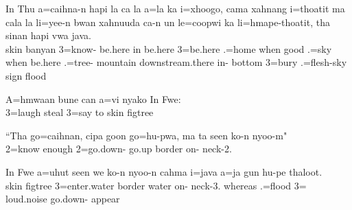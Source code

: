 \ea
\gll In Thu a=caihna-n hapi la ca la a=la ka i=xhoogo, cama xahnang i=thoatit ma cala la li=yee-n bwan xahnuuda ca-n un le=coopwi ka li=hmape-thoatit, tha sinan hapi vwa java.\\ skin banyan 3=know-  be.here in be.here 3=be.here  .=home when good .=sky  when be.here .=tree- mountain downstream.there in- bottom 3=bury  .=flesh-sky  sign   flood\\ \glt {} 
\z

\ea
\gll A=hmwaan bune can a=vi nyako In Fwe:\\ 3=laugh steal  3=say to skin figtree\\ \glt {} 
\z

\ea
\gll ``Tha go=caihnan, cipa goon go=hu-pwa, ma ta seen ko-n nyoo-m"\\  2=know  enough 2=go.down-  go.up border on- neck-2.\\ \glt  {}
\z

\ea
\gll In Fwe a=uhut seen we ko-n nyoo-n cahma i=java a=ja gun hu-pe thaloot.\\ 
     skin figtree 3=enter.water border water on- neck-3. whereas .=flood 3= loud.noise go.down- appear\\ 
\glt {} 
\z

